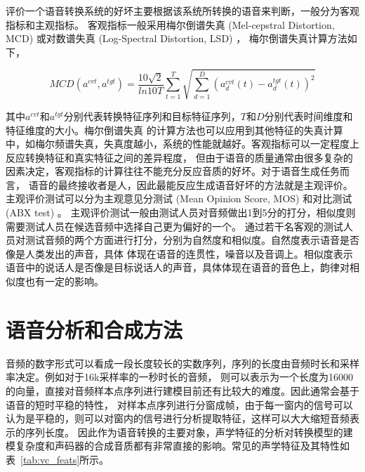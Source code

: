 评价一个语音转换系统的好坏主要根据该系统所转换的语音来判断，一般分为客观指标和主观指标。
客观指标一般采用梅尔倒谱失真 (Mel-cepstral Distortion, MCD) 或对数谱失真 (Log-Spectral Distortion, LSD) ，
梅尔倒谱失真计算方法如下，

$$MCD(a^{cvt}, a^{tgt})=\frac{10\sqrt{2}}{ln10T}\sum^{T}_{t=1}\sqrt{\sum^{D}_{d=1}(a^{cvt}_{d}(t)-a^{tgt}_{d}(t))^2}$$

其中$a^{cvt}$和$a^{tgt}$分别代表转换特征序列和目标特征序列，$T$和$D$分别代表时间维度和特征维度的大小。梅尔倒谱失真
的计算方法也可以应用到其他特征的失真计算中，如梅尔频谱失真，失真度越小，系统的性能就越好。客观指标可以一定程度上反应转换特征和真实特征之间的差异程度，
但由于语音的质量通常由很多复杂的因素决定，客观指标的计算往往不能充分反应音质的好坏。对于语音生成任务而言，
语音的最终接收者是人，因此最能反应生成语音好坏的方法就是主观评价。主观评价测试可以分为主观意见分测试 (Mean Opinion Score, MOS) 和对比测试 (ABX test) 。
主观评价测试一般由测试人员对音频做出1到5分的打分，相似度则需要测试人员在候选音频中选择自己更为偏好的一个。
通过若干名客观的测试人员对测试音频的两个方面进行打分，分别为自然度和相似度。自然度表示语音是否像是人类发出的声音，具体
体现在语音的连贯性，噪音以及音调上。相似度表示语音中的说话人是否像是目标说话人的声音，具体体现在语音的音色上，韵律对相似度也有一定的影响。


\section{语音分析和合成方法}
音频的数字形式可以看成一段长度较长的实数序列，序列的长度由音频时长和采样率决定。例如对于16k采样率的一秒时长的音频，
则可以表示为一个长度为16000的向量，直接对音频样本点序列进行建模目前还有比较大的难度。因此通常会基于语音的短时平稳的特性，
对样本点序列进行分窗成帧，由于每一窗内的信号可以认为是平稳的，则可以对窗内的信号进行分析提取特征，这样可以大大缩短音频表示的序列长度。
因此作为语音转换的主要对象，声学特征的分析对转换模型的建模复杂度和声码器的合成音质都有非常直接的影响。常见的声学特征及其特性如表~\ref{tab:vc_feats}所示\cite{Nurminen2012Voice}。


